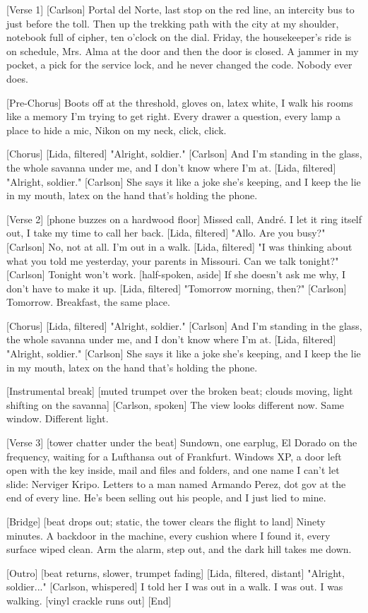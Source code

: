 \begin{lyrics}

[Verse 1]
[Carlson]
Portal del Norte, last stop on the red line,
an intercity bus to just before the toll.
Then up the trekking path with the city at my shoulder,
notebook full of cipher, ten o'clock on the dial.
Friday, the housekeeper's ride is on schedule,
Mrs. Alma at the door and then the door is closed.
A jammer in my pocket, a pick for the service lock,
and he never changed the code. Nobody ever does.

[Pre-Chorus]
Boots off at the threshold,
gloves on, latex white,
I walk his rooms like a memory
I'm trying to get right.
Every drawer a question,
every lamp a place to hide a mic,
Nikon on my neck, click,
click.

[Chorus]
[Lida, filtered]
"Alright, soldier."
[Carlson]
And I'm standing in the glass,
the whole savanna under me, and I don't know where I'm at.
[Lida, filtered]
"Alright, soldier."
[Carlson]
She says it like a joke she's keeping,
and I keep the lie in my mouth,
latex on the hand that's holding the phone.

[Verse 2]
[phone buzzes on a hardwood floor]
Missed call, André.
I let it ring itself out, I take my time to call her back.
[Lida, filtered]
"Allo. Are you busy?"
[Carlson]
No, not at all. I'm out in a walk.
[Lida, filtered]
"I was thinking about what you told me yesterday,
your parents in Missouri. Can we talk tonight?"
[Carlson]
Tonight won't work.
[half-spoken, aside]
If she doesn't ask me why, I don't have to make it up.
[Lida, filtered]
"Tomorrow morning, then?"
[Carlson]
Tomorrow. Breakfast, the same place.

[Chorus]
[Lida, filtered]
"Alright, soldier."
[Carlson]
And I'm standing in the glass,
the whole savanna under me, and I don't know where I'm at.
[Lida, filtered]
"Alright, soldier."
[Carlson]
She says it like a joke she's keeping,
and I keep the lie in my mouth,
latex on the hand that's holding the phone.

[Instrumental break]
[muted trumpet over the broken beat; clouds moving, light shifting on the savanna]
[Carlson, spoken]
The view looks different now.
Same window. Different light.

[Verse 3]
[tower chatter under the beat]
Sundown, one earplug, El Dorado on the frequency,
waiting for a Lufthansa out of Frankfurt.
Windows XP, a door left open with the key inside,
mail and files and folders, and one name I can't let slide:
Nerviger Kripo.
Letters to a man named Armando Perez,
dot gov at the end of every line.
He's been selling out his people,
and I just lied to mine.

[Bridge]
[beat drops out; static, the tower clears the flight to land]
Ninety minutes.
A backdoor in the machine,
every cushion where I found it,
every surface wiped clean.
Arm the alarm, step out,
and the dark hill takes me down.

[Outro]
[beat returns, slower, trumpet fading]
[Lida, filtered, distant]
"Alright, soldier..."
[Carlson, whispered]
I told her I was out in a walk.
I was out.
I was walking.
[vinyl crackle runs out]
[End]
\end{lyrics}

